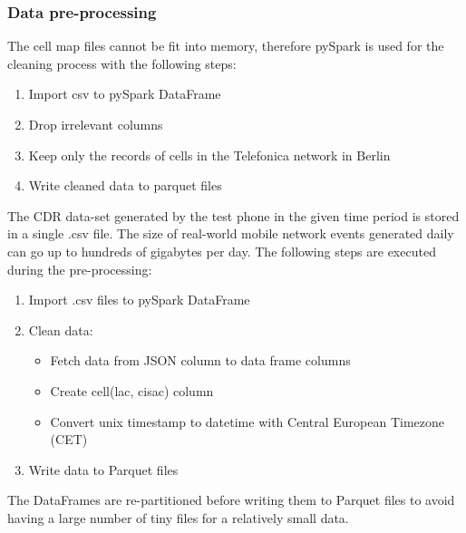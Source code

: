 \subsubsection{Data pre-processing}
The cell map files cannot be fit into memory, therefore pySpark is used for the cleaning process with the following steps: 
\begin{enumerate}
    \item Import csv to pySpark DataFrame
    \item Drop irrelevant columns
    \item Keep only the records of cells in the Telefonica network in Berlin
    \item Write cleaned data to parquet files
\end{enumerate}

The CDR data-set generated by the test phone in the given time period is stored in a single .csv file. The size of real-world mobile network events generated daily can go up to hundreds of gigabytes per day. The following steps are executed during the pre-processing: 
\begin{enumerate}
   \item Import .csv files to pySpark DataFrame
    \item Clean data:
    \begin{itemize}
        \item Fetch data from JSON column to data frame columns
        \item Create cell(lac, cisac) column
        \item Convert unix timestamp to datetime with Central European Timezone (CET)
    \end{itemize}
    \item Write data to Parquet files
\end{enumerate}

The DataFrames are re-partitioned before writing them to Parquet files to avoid having a large number of tiny files for a relatively small data. 

